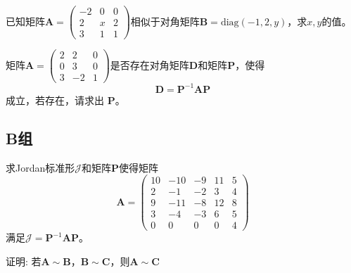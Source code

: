 \begin{reidai}
	已知矩阵$\mathbf{A}=\begin{pmatrix}
	-2 & 0 & 0 \\
	2 & x & 2 \\
	3 & 1 & 1
	\end{pmatrix}$相似于对角矩阵$\mathbf{B}=\text{diag}\left( -1,2,y \right)$，求$x,y$的值。
\end{reidai}

\begin{reidai}
	矩阵$\mathbf{A}=\begin{pmatrix}
2 & 2 & 0 \\
0 & 3 & 0 \\
3 & -2 & 1
\end{pmatrix}$是否存在对角矩阵$\mathbf{D}$和矩阵$\mathbf{P}$，使得$$\mathbf{D}=\mathbf{P}^{-1}\mathbf{A}\mathbf{P}$$成立，若存在，请求出 $\mathbf{P}$。
\end{reidai}

\subsection{B组}

\begin{reidai}
	求Jordan标准形$\mathscr{J}$和矩阵$\mathbf{P}$使得矩阵$$\mathbf{A}=\begin{pmatrix}
	10 & -10 & -9 & 11 & 5 \\
	2 & -1 & -2 & 3 & 4 \\
	9 & -11 & -8 & 12 & 8 \\
	3 & -4 & -3 & 6 & 5 \\
	0 & 0 & 0 & 0 & 4
	\end{pmatrix}$$满足$\mathscr{J}=\mathbf{P}^{-1}\mathbf{A}\mathbf{P}$。
\end{reidai}

\begin{reidai}
	证明: 若$\mathbf{A}\sim \mathbf{B}$，$\mathbf{B}\sim \mathbf{C}$，则$\mathbf{A}\sim\mathbf{C}$
\end{reidai}
